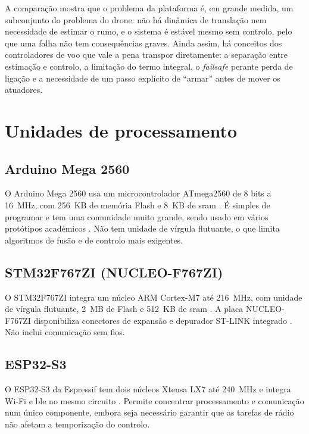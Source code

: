 A comparação mostra que o problema da plataforma é, em grande medida, um subconjunto do problema do drone: não há dinâmica de translação nem necessidade de estimar o rumo, e o sistema é estável mesmo sem controlo, pelo que uma falha não tem consequências graves. Ainda assim, há conceitos dos controladores de voo que vale a pena transpor diretamente: a separação entre estimação e controlo, a limitação do termo integral, o \textit{failsafe} perante perda de ligação e a necessidade de um passo explícito de \enquote{armar} antes de mover os atuadores.

\section{Unidades de processamento}

\subsection{Arduino Mega 2560}
O Arduino Mega 2560 usa um microcontrolador ATmega2560 de 8 bits a 16~MHz, com 256~KB de memória Flash e 8~KB de \gls{sram} \cite{arduinomega}. É simples de programar e tem uma comunidade muito grande, sendo usado em vários protótipos académicos \cite{tawfeeq2022}. Não tem unidade de vírgula flutuante, o que limita algoritmos de fusão e de controlo mais exigentes.

\subsection{STM32F767ZI (NUCLEO-F767ZI)}
O STM32F767ZI integra um núcleo ARM Cortex-M7 até 216~MHz, com unidade de vírgula flutuante, 2~MB de Flash e 512~KB de \gls{sram} \cite{stm32}. A placa NUCLEO-F767ZI disponibiliza conectores de expansão e depurador ST-LINK integrado \cite{nucleo}. Não inclui comunicação sem fios.

\subsection{ESP32-S3}
O ESP32-S3 da Espressif tem dois núcleos Xtensa LX7 até 240~MHz e integra Wi-Fi e \gls{ble} no mesmo circuito \cite{esp32s3ds,esp32}. Permite concentrar processamento e comunicação num único componente, embora seja necessário garantir que as tarefas de rádio não afetam a temporização do controlo.

